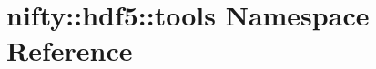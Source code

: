\hypertarget{namespacenifty_1_1hdf5_1_1tools}{}\section{nifty\+:\+:hdf5\+:\+:tools Namespace Reference}
\label{namespacenifty_1_1hdf5_1_1tools}
